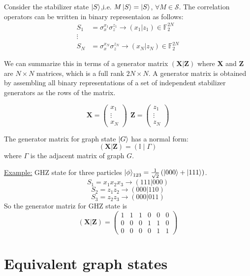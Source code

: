 \documentclass[10pt,a4paper]{book}
\numberwithin{equation}{chapter}
\numberwithin{figure}{chapter}
\numberwithin{table}{chapter}
\begin{document}
Consider the stabilizer state $\ket{S}$,i.e. $M \ket{S}=\ket{S}$, $\forall M \in \mathcal{S}$. The correlation operators can be written in binary representaion as follows:
\begin{align}
 S_{1}&=\sigma^{x_1}_{x} \sigma^{z_1}_{z} \rightarrow (x_{1}|z_{1}) \in \mathbb{F}^{2N}_{2} \\
 \nonumber \vdots \\
S_{N}&=\sigma^{x_N}_{x} \sigma^{z_N}_{z} \rightarrow (x_{N}|z_{N}) \in \mathbb{F}^{2N}_{2} 
\end{align}

We can summarize this in terms of a generator matrix $(\textbf{X}|\textbf{Z})$ where \textbf{X} and \textbf{Z} are $N \times N$ matrices, which is a full rank $2N \times N$. A generator matrix is obtained by assembling all binary representations of a set of independent stabilizer generators as the rows of the matrix.

$$\textbf{X}=\left( \begin{array}{c} x_1 \\ \vdots \\ x_N \end{array}\right) \ \ \textbf{Z}=\left( \begin{array}{c} z_1 \\ \vdots \\ z_N \end{array}\right)$$

The generator matrix for graph state $\ket{G}$ has a normal form:
\begin{equation}
(\textbf{X}|\textbf{Z})=\left( \mathbb{I} \mid \Gamma \right)
\end{equation}
where $\Gamma$ is the adjacent matrix of graph $G$.

\underline{Example:} GHZ state for three particles $\ket{\phi}_{123}=\frac{1}{\sqrt{2}}\left(\ket{000}+\ket{111}\right)$.
$$S_{1}=x_{1}x_{2}x_{3} \rightarrow (111|000)$$
$$S_{2}=z_{1}z_{2} \rightarrow (000|110)$$
$$S_{3}=z_{2}z_{3} \rightarrow (000|011)$$
So the generator matriz for GHZ state is
$$(\textbf{X}|\textbf{Z})=\left( \begin{array}{ccc|ccc} 1&1&1& 0&0&0\\
0&0&0&1&1&0 \\
0&0&0&0&1&1
\end{array}\right)$$

\section{Equivalent graph states}
\end{document}
